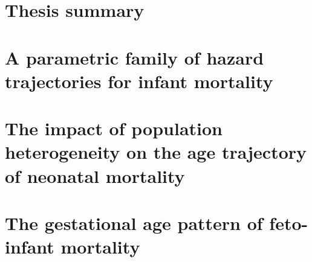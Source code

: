 \documentclass[10pt, twoside]{book}
\begin{document}
% 
% 
% 
% 
% 
% 
% 
% 
% 
% 
% 
% 
% 
% 
% 


\renewcommand{\thechapter}{\Roman{chapter}}

\chapter{Thesis summary}



\chapter{A parametric family of hazard trajectories for infant mortality}



\chapter{The impact of population heterogeneity on the age trajectory of neonatal mortality}



\chapter{The gestational age pattern of feto-infant mortality}


\end{document}
